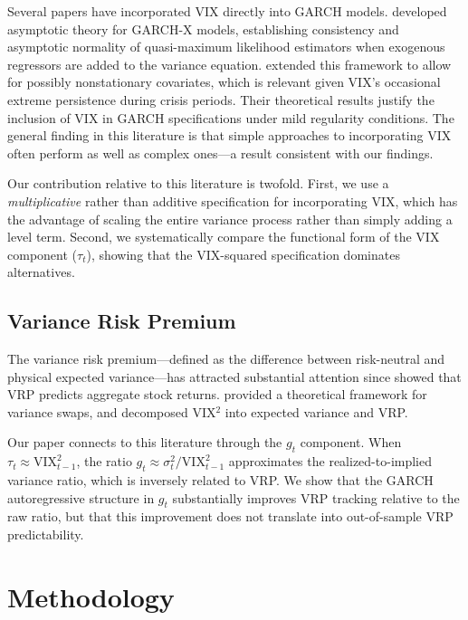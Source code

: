 \documentclass[12pt,a4paper]{article}
\begin{document}
Several papers have incorporated VIX directly into GARCH models. \citet{han2014} developed asymptotic theory for GARCH-X models, establishing consistency and asymptotic normality of quasi-maximum likelihood estimators when exogenous regressors are added to the variance equation. \citet{francq2019} extended this framework to allow for possibly nonstationary covariates, which is relevant given VIX's occasional extreme persistence during crisis periods. Their theoretical results justify the inclusion of VIX in GARCH specifications under mild regularity conditions. The general finding in this literature is that simple approaches to incorporating VIX often perform as well as complex ones---a result consistent with our findings.

Our contribution relative to this literature is twofold. First, we use a \emph{multiplicative} rather than additive specification for incorporating VIX, which has the advantage of scaling the entire variance process rather than simply adding a level term. Second, we systematically compare the functional form of the VIX component ($\tau_t$), showing that the VIX-squared specification dominates alternatives.

\subsection{Variance Risk Premium}

The variance risk premium---defined as the difference between risk-neutral and physical expected variance---has attracted substantial attention since \citet{bollerslev2009} showed that VRP predicts aggregate stock returns. \citet{carr2009} provided a theoretical framework for variance swaps, and \citet{bekaert2014} decomposed VIX$^2$ into expected variance and VRP.

Our paper connects to this literature through the $g_t$ component. When $\tau_t \approx \mathrm{VIX}_{t-1}^2$, the ratio $g_t \approx \sigma_t^2 / \mathrm{VIX}_{t-1}^2$ approximates the realized-to-implied variance ratio, which is inversely related to VRP. We show that the GARCH autoregressive structure in $g_t$ substantially improves VRP tracking relative to the raw ratio, but that this improvement does not translate into out-of-sample VRP predictability.


\section{Methodology}
\label{sec:methodology}
\end{document}
